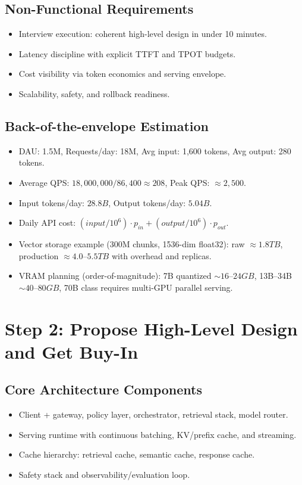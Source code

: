 \subsection*{Non-Functional Requirements}
\begin{itemize}
  \item Interview execution: coherent high-level design in under 10 minutes.
  \item Latency discipline with explicit TTFT and TPOT budgets.
  \item Cost visibility via token economics and serving envelope.
  \item Scalability, safety, and rollback readiness.
\end{itemize}

\subsection*{Back-of-the-envelope Estimation}
\begin{itemize}
  \item DAU: 1.5M, Requests/day: 18M, Avg input: 1,600 tokens, Avg output: 280 tokens.
  \item Average QPS: $18,000,000/86,400 \approx 208$, Peak QPS: $\approx 2,500$.
  \item Input tokens/day: $28.8B$, Output tokens/day: $5.04B$.
  \item Daily API cost: $(input/10^6)\cdot p_{in} + (output/10^6)\cdot p_{out}$.
  \item Vector storage example (300M chunks, 1536-dim float32): raw $\approx 1.8TB$, production $\approx 4.0$--$5.5TB$ with overhead and replicas.
  \item VRAM planning (order-of-magnitude): 7B quantized $\sim 16$--$24GB$, 13B--34B $\sim 40$--$80GB$, 70B class requires multi-GPU parallel serving.
\end{itemize}

\section*{Step 2: Propose High-Level Design and Get Buy-In}
\subsection*{Core Architecture Components}
\begin{itemize}
  \item Client + gateway, policy layer, orchestrator, retrieval stack, model router.
  \item Serving runtime with continuous batching, KV/prefix cache, and streaming.
  \item Cache hierarchy: retrieval cache, semantic cache, response cache.
  \item Safety stack and observability/evaluation loop.
\end{itemize}

